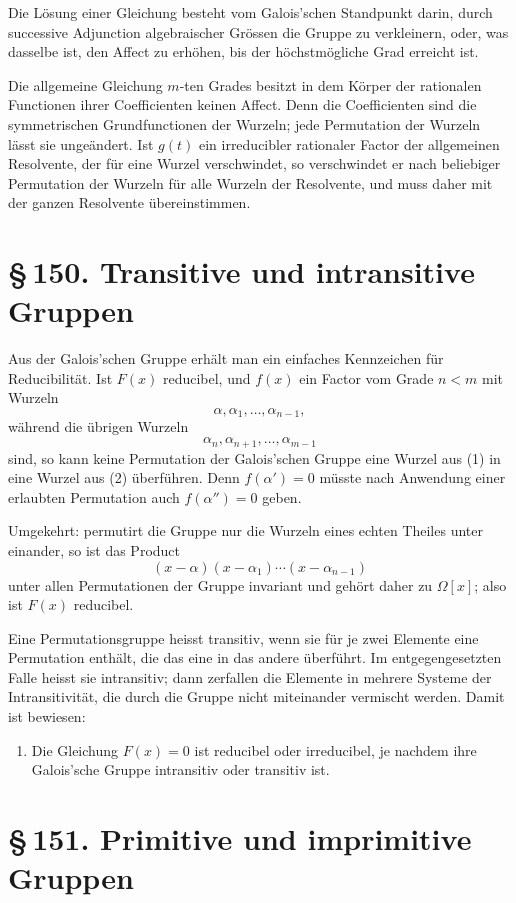 \documentclass[11pt]{article}
\providecommand{\sect}[2]{\section*{\S\,#1. #2}}
\begin{document}
Die Lösung einer Gleichung besteht vom Galois'schen Standpunkt darin, durch successive Adjunction algebraischer Grössen die Gruppe zu verkleinern, oder, was dasselbe ist, den Affect zu erhöhen, bis der höchstmögliche Grad erreicht ist.

Die allgemeine Gleichung $m$-ten Grades besitzt in dem Körper der rationalen Functionen ihrer Coefficienten keinen Affect. Denn die Coefficienten sind die symmetrischen Grundfunctionen der Wurzeln; jede Permutation der Wurzeln lässt sie ungeändert. Ist $g(t)$ ein irreducibler rationaler Factor der allgemeinen Resolvente, der für eine Wurzel verschwindet, so verschwindet er nach beliebiger Permutation der Wurzeln für alle Wurzeln der Resolvente, und muss daher mit der ganzen Resolvente übereinstimmen.

\sect{150}{Transitive und intransitive Gruppen}

Aus der Galois'schen Gruppe erhält man ein einfaches Kennzeichen für Reducibilität. Ist $F(x)$ reducibel, und $f(x)$ ein Factor vom Grade $n<m$ mit Wurzeln
\[
        \alpha,\alpha_1,\ldots,\alpha_{n-1},
\tag{1}
\]
während die übrigen Wurzeln
\[
        \alpha_n,\alpha_{n+1},\ldots,\alpha_{m-1}
\tag{2}
\]
sind, so kann keine Permutation der Galois'schen Gruppe eine Wurzel aus (1) in eine Wurzel aus (2) überführen. Denn $f(\alpha')=0$ müsste nach Anwendung einer erlaubten Permutation auch $f(\alpha'')=0$ geben.

Umgekehrt: permutirt die Gruppe nur die Wurzeln eines echten Theiles unter einander, so ist das Product
\[
        (x-\alpha)(x-\alpha_1)\cdots(x-\alpha_{n-1})
\]
unter allen Permutationen der Gruppe invariant und gehört daher zu $\Omega[x]$; also ist $F(x)$ reducibel.

Eine Permutationsgruppe heisst transitiv, wenn sie für je zwei Elemente eine Permutation enthält, die das eine in das andere überführt. Im entgegengesetzten Falle heisst sie intransitiv; dann zerfallen die Elemente in mehrere Systeme der Intransitivität, die durch die Gruppe nicht miteinander vermischt werden. Damit ist bewiesen:
\begin{enumerate}[label=\arabic*.,leftmargin=2em]
\item Die Gleichung $F(x)=0$ ist reducibel oder irreducibel, je nachdem ihre Galois'sche Gruppe intransitiv oder transitiv ist.
\end{enumerate}

\sect{151}{Primitive und imprimitive Gruppen}
\end{document}
